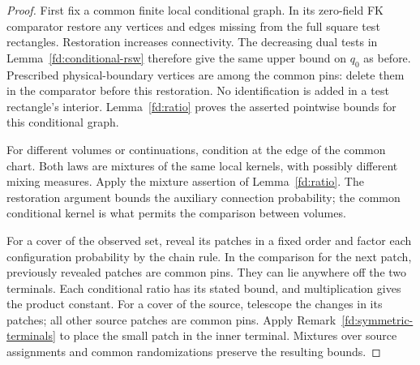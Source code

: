 \begin{proof}
First fix a common finite local conditional graph. In its zero-field
FK comparator restore any vertices and edges missing from the full
square test rectangles. Restoration increases connectivity. The
decreasing dual tests in Lemma~\ref{fd:conditional-rsw} therefore give
the same upper bound on $q_0$ as before. Prescribed physical-boundary
vertices are among the common pins: delete them in the comparator
before this restoration. No identification is added in a test
rectangle's interior. Lemma~\ref{fd:ratio} proves the asserted
pointwise bounds for this conditional graph.

For different volumes or continuations, condition at the edge of the
common chart. Both laws are mixtures of the same local kernels, with
possibly different mixing measures. Apply the mixture assertion of
Lemma~\ref{fd:ratio}. The restoration argument bounds the auxiliary
connection probability; the common conditional kernel is what permits
the comparison between volumes.

For a cover of the observed set, reveal its patches in a fixed order
and factor each configuration probability by the chain rule. In the
comparison for the next patch, previously revealed patches are common
pins. They can lie anywhere off the two terminals. Each conditional
ratio has its stated bound, and multiplication gives the product
constant. For a cover of the source, telescope the changes in its
patches; all other source patches are common pins. Apply
Remark~\ref{fd:symmetric-terminals} to place the small patch in the
inner terminal. Mixtures over source assignments and common
randomizations preserve the resulting bounds.
\end{proof}
